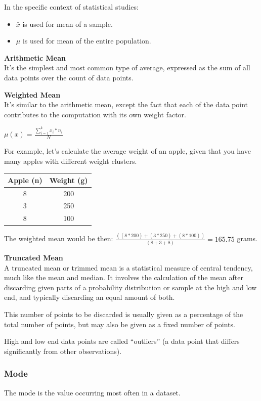 \documentclass{article}
\begin{document}
In the specific context of statistical studies:
\begin{itemize}
    \item $\bar{x}$ is used for mean of a  sample.
    \item $\mu$ is used for mean of the entire population.
\end{itemize}

\textbf{Arithmetic Mean} \\
It's the simplest and most common type of  average, expressed as the sum of all data points over the count of data points.

\textbf{Weighted Mean} \\ 
It's similar to the arithmetic mean, except the fact that each of the data point contributes to the computation with its own weight factor.

$ \displaystyle \mu(x) = \frac{\sum \limits ^{k} _{i=1} x_i * n_i}{N}$

For example, let's calculate the average weight of an apple, given that you have many apples with different weight clusters.

\begin{center}
\begin{tabular}{|c|c|}
\hline
Apple (n) & Weight (g) \\ \hline
8 & 200 \\ 
3 & 250 \\ 
8 & 100 \\
\hline
\end{tabular}
\end{center}

The weighted mean would be then: $\frac{((8*200)+(3*250)+(8*100))}{(8+3+8)} = 165.75$ grams.  

\textbf{Truncated Mean} \\ 
A truncated mean or trimmed mean is a statistical measure of central tendency, much like the mean and median. It involves the calculation of the mean after discarding given parts of a probability distribution or sample at the high and low end, and typically discarding an equal amount of both. 

This number of points to be discarded is usually given as a percentage of the total number of points, but may also be given as a fixed number of points.

High and low end data points are called “outliers” (a data point that differs significantly from other observations).

\subsubsection{Mode}
The mode is the value occurring most often in a dataset.
\end{document}
